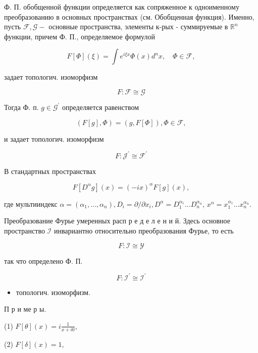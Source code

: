 \documentclass[10pt]{article}
\begin{document}
Ф. П. обобщенной функции определяется как сопряженное к одноименному преобразованию в основных пространствах (см. Обобщенная функция). Именно, пусть $\mathscr{F}, \mathscr{G}-$ основные пространства, элементы к-рых - суммируемые в $\mathbb{R}^{n}$ функции, причем Ф. П., определяемое формулой



\[

F[\Phi](\xi)=\int e^{i \xi x} \Phi(x) d^{n} x, \quad \Phi \in \mathscr{F},

\]



задает топологич. изоморфизм



\[

F: \mathscr{F} \cong \mathscr{G}

\]



Тогда Ф. п. $g \in \mathscr{G}^{\prime}$ определяется равенством



\[

(F[g], \Phi)=(g, F[\Phi]), \Phi \in \mathscr{F},

\]



и задает топологич. изоморфизм



\[

F: \mathscr{J}^{\prime} \cong \mathscr{F}^{\prime}

\]



В стандартных пространствах



\[

F\left[D^{\alpha} g\right](x)=(-i x)^{\alpha} F[g](x),

\]



где мультииндекс $\alpha=\left(\alpha_{1}, \ldots, \alpha_{n}\right), D_{i}=\partial / \partial x_{i}, D^{\alpha}=D_{1}^{\alpha_{1}} \ldots D_{n}^{\alpha_{n}}$, $x^{\alpha}=x_{1}^{\alpha_{1}} \ldots x_{n}^{\alpha_{n}}$.



Преобразование Фурье умеренных расп р е д е л е н и й. Здесь основное пространство $\mathscr{I}$ инвариантно относительно преобразования Фурье, то есть



\[

F: \mathscr{I} \cong \mathcal{Y}

\]



так что определено Ф. П.



\[

F: \mathscr{I}^{\prime} \cong \mathscr{I}^{\prime}

\]



\begin{itemize}

  \item топологич. изоморфизм.

\end{itemize}



П р и ме р ы.

(1) $F[\theta](x)=i \frac{1}{x+i 0}$,

(2) $F[\delta](x)=1$,
\end{document}
